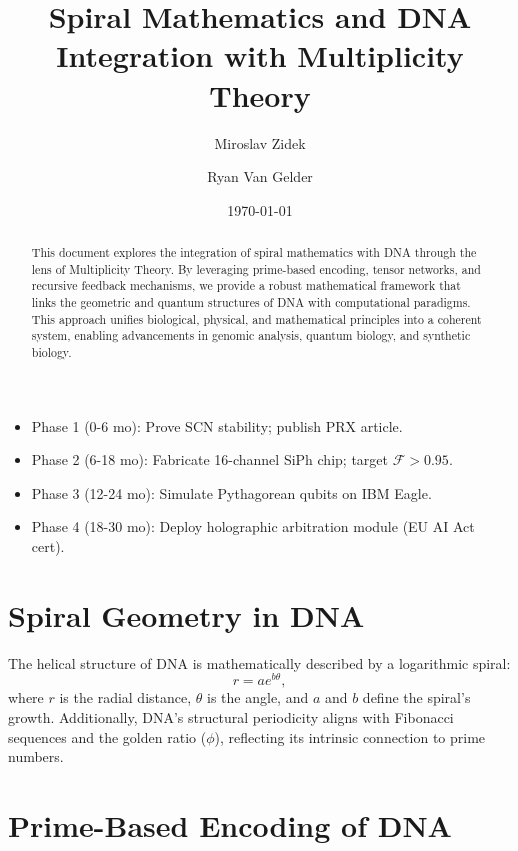 \documentclass[11pt]{article}
\begin{document}
\begin{itemize}
  \item Phase 1 (0-6 mo): Prove SCN stability; publish PRX article.
  \item Phase 2 (6-18 mo): Fabricate 16-channel SiPh chip; target $\mathcal{F} > 0.95$.
  \item Phase 3 (12-24 mo): Simulate Pythagorean qubits on IBM Eagle.
  \item Phase 4 (18-30 mo): Deploy holographic arbitration module (EU AI Act cert).
\end{itemize}
\title{Spiral Mathematics and DNA Integration with Multiplicity Theory}
\author[1]{Miroslav Zidek}
\author[2]{Ryan Van Gelder}
\date{\today}
\maketitle

\begin{abstract}
This document explores the integration of spiral mathematics with DNA through the lens of Multiplicity Theory. By leveraging prime-based encoding, tensor networks, and recursive feedback mechanisms, we provide a robust mathematical framework that links the geometric and quantum structures of DNA with computational paradigms. This approach unifies biological, physical, and mathematical principles into a coherent system, enabling advancements in genomic analysis, quantum biology, and synthetic biology.
\end{abstract}
\section{Spiral Geometry in DNA}
The helical structure of DNA is mathematically described by a logarithmic spiral:
\begin{equation}
    r = ae^{b\theta},
\end{equation}
where \( r \) is the radial distance, \( \theta \) is the angle, and \( a \) and \( b \) define the spiral's growth. Additionally, DNA's structural periodicity aligns with Fibonacci sequences and the golden ratio (\( \phi \)), reflecting its intrinsic connection to prime numbers.

\section{Prime-Based Encoding of DNA}
\end{document}
